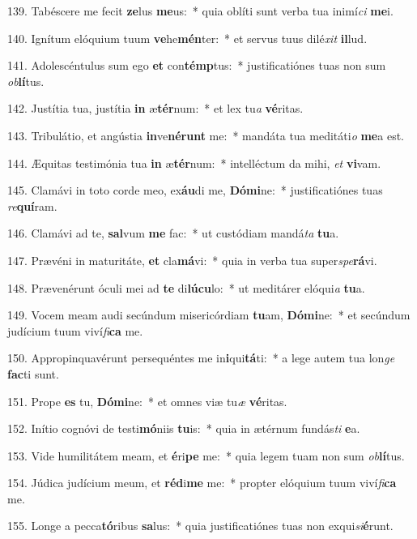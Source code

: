139. Tabéscere me fecit \textbf{ze}lus \textbf{me}us:~*  quia oblíti sunt verba tua inimí\textit{ci} \textbf{me}i.\

140. Ignítum elóquium tuum \textbf{ve}he\textbf{mén}ter:~*  et servus tuus dilé\textit{xit} \textbf{il}lud.\

141. Adolescéntulus sum ego \textbf{et} con\textbf{témp}tus:~*  justificatiónes tuas non sum \textit{ob}\textbf{lí}tus.\

142. Justítia tua, justítia \textbf{in} æ\textbf{tér}num:~*  et lex tu\textit{a} \textbf{vé}ritas.\

143. Tribulátio, et angústia \textbf{in}ve\textbf{né}\textbf{runt} me:~*  mandáta tua meditáti\textit{o} \textbf{me}a est.\

144. Æquitas testimónia tua \textbf{in} æ\textbf{tér}num:~*  intelléctum da mihi, \textit{et} \textbf{vi}vam.\

145. Clamávi in toto corde meo, ex\textbf{áu}di me, \textbf{Dó}\textbf{mi}ne:~*  justificatiónes tuas \textit{re}\textbf{quí}ram.\

146. Clamávi ad te, \textbf{sal}vum \textbf{me} fac:~*  ut custódiam mandá\textit{ta} \textbf{tu}a.\

147. Prævéni in maturitáte, \textbf{et} cla\textbf{má}vi:~*  quia in verba tua super\textit{spe}\textbf{rá}vi.\

148. Prævenérunt óculi mei ad \textbf{te} di\textbf{lú}\textbf{cu}lo:~*  ut meditárer elóqui\textit{a} \textbf{tu}a.\

149. Vocem meam audi secúndum misericórdiam \textbf{tu}am, \textbf{Dó}\textbf{mi}ne:~*  et secúndum judícium tuum viví\textit{fi}\textbf{ca} me.\

150. Appropinquavérunt persequéntes me in\textbf{i}qui\textbf{tá}ti:~*  a lege autem tua lon\textit{ge} \textbf{fac}ti sunt.\

151. Prope \textbf{es} tu, \textbf{Dó}\textbf{mi}ne:~*  et omnes viæ tu\textit{æ} \textbf{vé}ritas.\

152. Inítio cognóvi de testi\textbf{mó}niis \textbf{tu}is:~*  quia in ætérnum fundás\textit{ti} \textbf{e}a.\

153. Vide humilitátem meam, et \textbf{é}ri\textbf{pe} me:~*  quia legem tuam non sum \textit{ob}\textbf{lí}tus.\

154. Júdica judícium meum, et \textbf{réd}i\textbf{me} me:~*  propter elóquium tuum viví\textit{fi}\textbf{ca} me.\

155. Longe a pecca\textbf{tó}ribus \textbf{sa}lus:~*  quia justificatiónes tuas non exqui\textit{si}\textbf{é}runt.\

